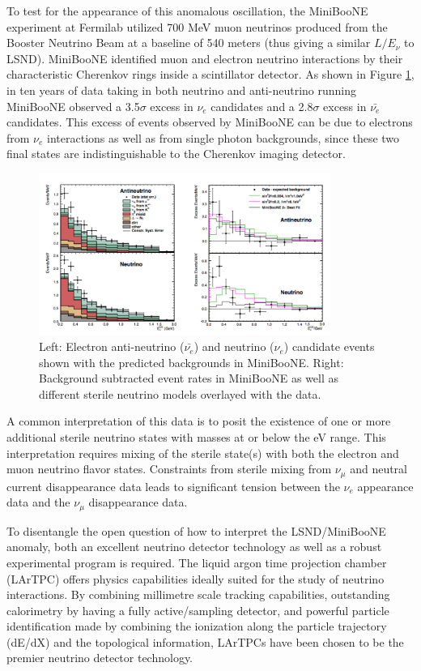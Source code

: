 To test for the appearance of this anomalous oscillation, the MiniBooNE experiment \cite{No17} at Fermilab utilized 700 MeV muon neutrinos produced from the Booster Neutrino Beam at a baseline of 540 meters (thus giving a similar $L/E_{\nu}$ to LSND). MiniBooNE identified muon and electron neutrino interactions by their characteristic Cherenkov rings inside a scintillator detector. As shown in Figure \ref{fig:minibooneExcess}, in ten years of data taking in both neutrino and anti-neutrino running MiniBooNE observed a 3.5$\sigma$ excess in $\nu_{e}$ candidates and a 2.8$\sigma$ excess in $\bar{\nu_{e}}$ candidates. This excess of events observed by MiniBooNE can be due to electrons from $\nu_{e}$ interactions as well as from single photon backgrounds, since these two final states are indistinguishable to the Cherenkov imaging detector.

\begin{figure}[htb]
\centering
\includegraphics[width=0.85\textwidth]{images/minibooneExcess.png}
\caption[]{Left: Electron anti-neutrino ($\bar{\nu_{e}}$) and neutrino ($\nu_{e}$) candidate events shown with the predicted backgrounds in MiniBooNE. Right: Background subtracted event rates in MiniBooNE as well as different sterile neutrino models overlayed with the data.}
\label{fig:minibooneExcess}
\end{figure}

A common interpretation of this data is to posit the existence of one or more additional sterile neutrino states with masses at or below the eV range. This interpretation requires mixing of the sterile state(s) with both the electron and muon neutrino flavor states. Constraints from sterile mixing from $\nu_{\mu}$ and neutral current disappearance data \cite{No18, No19} leads to significant tension between the $\nu_{e}$ appearance data and the $\nu_{\mu}$ disappearance data. 

To disentangle the open question of how to interpret the LSND/MiniBooNE anomaly, both an excellent neutrino detector technology as well as a robust experimental program is required.  The liquid argon time projection chamber (LArTPC) offers physics capabilities ideally suited for the study of neutrino interactions. By combining millimetre scale tracking capabilities, outstanding calorimetry by having a fully active/sampling detector, and powerful particle identification made by combining the ionization along the particle trajectory (dE/dX) and the topological information, LArTPCs have been chosen to be the premier neutrino detector technology. 


